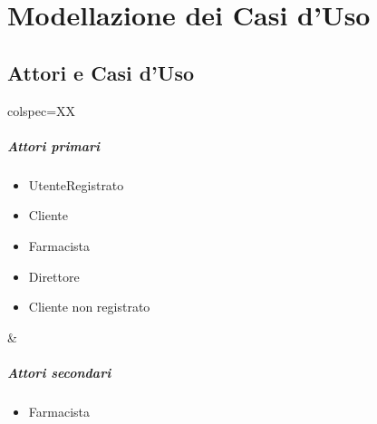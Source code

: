\chapter{Modellazione dei Casi d'Uso}

\section{Attori e Casi d'Uso}

\begin{table}[!hbp]
	\centering
	\begin{tblr}{colspec=XX}
		\begin{minipage}[t]{\linewidth}
			\paragraph{Attori primari}
			\begin{itemize}
				\item UtenteRegistrato
				\item Cliente
				\item Farmacista
				\item Direttore
				\item Cliente non registrato
			\end{itemize}
		\end{minipage} &
		\begin{minipage}[t]{\linewidth}
			\paragraph{Attori secondari}
			\begin{itemize}
				\item Farmacista
			\end{itemize}
		\end{minipage} \\
	\end{tblr}
\end{table}

